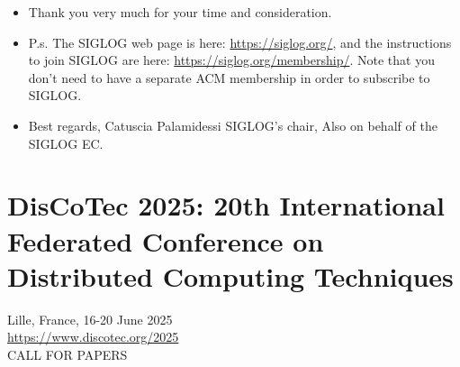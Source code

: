 \documentclass[prodmode,acmtecs]{acmsmall} %
\begin{document}
\begin{itemize}
\item  Thank you very much for your time and consideration.  
 
\item  P.s. The SIGLOG web page is here: \href{https://siglog.org/}{https://siglog.org/}, and the instructions to join SIGLOG are here:  \href{https://siglog.org/membership/}{https://siglog.org/membership/}. Note that you don't need to have a separate ACM membership in order to subscribe to SIGLOG. 
 
\item  Best regards, Catuscia Palamidessi SIGLOG's chair, Also on behalf of the SIGLOG EC.  
 
\end{itemize}\section{DisCoTec 2025: 20th International Federated Conference on Distributed Computing Techniques}\label{DisCoTec2025}  Lille, France, 16-20 June 2025\\ 
  \href{https://www.discotec.org/2025}{https://www.discotec.org/2025}\\ 
CALL FOR PAPERS 
\end{document}
